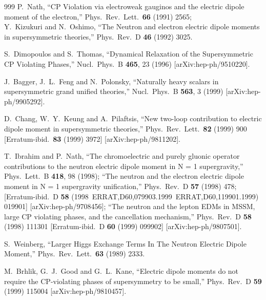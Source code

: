 \begin{thebibliography}{999}
  P.~Nath,
  ``CP Violation via electroweak gauginos and the electric dipole moment of the
  electron,''
  Phys.\ Rev.\ Lett.\  {\bf 66} (1991) 2565;\\
 Y.~Kizukuri and N.~Oshimo,
  ``The Neutron and electron electric dipole moments in supersymmetric
  theories,''
  Phys.\ Rev.\ D {\bf 46} (1992) 3025.

S.~Dimopoulos and S.~Thomas,
``Dynamical Relaxation of the Supersymmetric CP Violating Phases,''
Nucl.\ Phys.\ B {\bf 465}, 23 (1996)
[arXiv:hep-ph/9510220].

J.~Bagger, J.~L.~Feng and N.~Polonsky,
  ``Naturally heavy scalars in supersymmetric grand unified theories,''
  Nucl.\ Phys.\ B {\bf 563}, 3 (1999)
  [arXiv:hep-ph/9905292].

  D.~Chang, W.~Y.~Keung and A.~Pilaftsis,
  ``New two-loop contribution to electric dipole moment in supersymmetric
  theories,''
  Phys.\ Rev.\ Lett.\  {\bf 82} (1999) 900
  [Erratum-ibid.\  {\bf 83} (1999) 3972]
  [arXiv:hep-ph/9811202].

 T.~Ibrahim and P.~Nath,
``The chromoelectric and purely gluonic operator contributions to the  neutron electric dipole moment in N = 1 supergravity,''
Phys.\ Lett.\ B {\bf 418}, 98 (1998);
  ``The neutron and the electron electric dipole moment in N = 1  supergravity
  unification,''
  Phys.\ Rev.\ D {\bf 57} (1998) 478;
  [Erratum-ibid.\ D {\bf 58} (1998\ ERRAT,D60,079903.1999\ ERRAT,D60,119901.1999) 019901]
  [arXiv:hep-ph/9708456];
  ``The neutron and the lepton EDMs in MSSM, large CP violating phases, and
  the cancellation mechanism,''
  Phys.\ Rev.\ D {\bf 58} (1998) 111301
  [Erratum-ibid.\ D {\bf 60} (1999) 099902]
  [arXiv:hep-ph/9807501].

  S.~Weinberg,
  ``Larger Higgs Exchange Terms In The Neutron Electric Dipole Moment,''
  Phys.\ Rev.\ Lett.\  {\bf 63} (1989) 2333.

  M.~Brhlik, G.~J.~Good and G.~L.~Kane,
  ``Electric dipole moments do not require the CP-violating phases of
  supersymmetry to be small,''
  Phys.\ Rev.\ D {\bf 59} (1999) 115004
  [arXiv:hep-ph/9810457].


\end{thebibliography}
